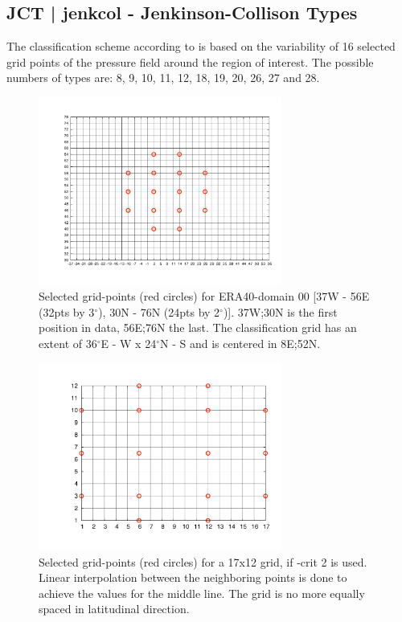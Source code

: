 \documentclass[12pt, oneside, a4paper, headsepline, plainheadsepline]{scrbook}
\newcommand{\degree}{\ensuremath{^\circ}}
\begin{document}
\subsection{JCT | jenkcol - Jenkinson-Collison Types}

The classification scheme according to \citet{Jenkinson1977} is based on the variability of 16 selected
grid points of the pressure field around the region of interest.
The possible numbers of types are:
8, 9, 10, 11, 12, 18, 19, 20, 26, 27 and 28.\\

\begin{figure}[h]
\centering
\includegraphics[width=8cm]{jct00.pdf}
\caption{
Selected grid-points (red circles) for ERA40-domain 00 [37W - 56E (32pts by 3\degree), 30N - 76N (24pts by 2\degree)]. 
37W;30N is the first position in data, 56E;76N the last. The classification grid has an extent 
of 36\degree E - W x 24\degree N - S and is centered in 8E;52N. }
\label{fig:jct00}
\end{figure}

\begin{figure}[h]
\centering
\includegraphics[width=8cm]{jct06v.pdf}
\caption{
Selected grid-points (red circles) for a 17x12 grid, if -crit 2 is used. Linear interpolation between the neighboring points is done to achieve the values for the middle line. The grid is no more equally spaced in latitudinal direction.}
\label{fig:jct06v}
\end{figure}
\end{document}

